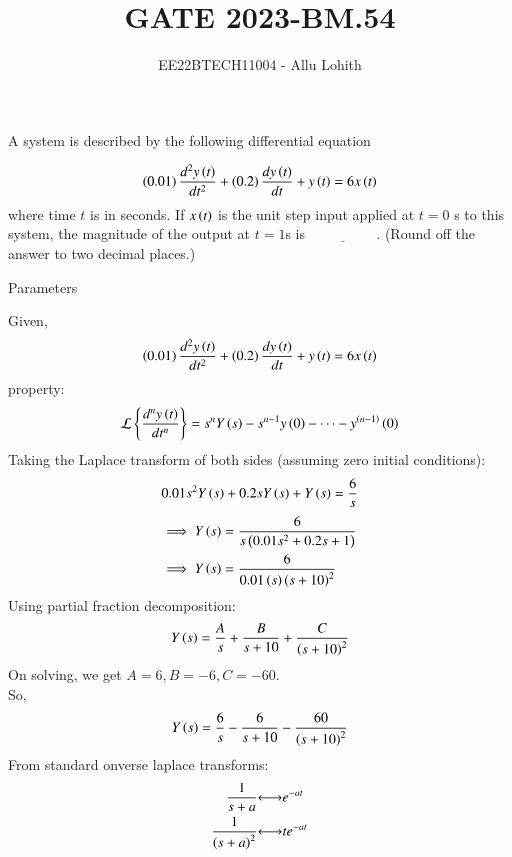 \documentclass[journal,12pt,twocolumn]{IEEEtran}
\theoremstyle{remark}
\begin{document}

\vspace{3cm}

\title{GATE 2023-BM.54}
\author{EE22BTECH11004 - Allu Lohith}

\maketitle

    A system is described by the following differential equation
    
    $$\left(0.01\right) \frac{d^2y\left(t\right)}{dt^2} + \left(0.2\right)\frac{dy\left(t\right) }{dt} + y\left(t\right) = 6x\left(t\right)$$
    where time $t$ is in seconds. If $x\left(t\right)$ is the unit step input applied at $t = 0$ s to this system, the magnitude of the output at $t = 1$s is $\underline{\hspace{2cm}}$. (Round off the answer to two decimal places.)\\
    
\solution
\begin{table}[h!]
\centering

\vspace{0.5cm}
\caption{\normalsize Parameters}
\end{table}
    Given,
    \begin{align}
         \left(0.01\right) \frac{d^2y\left(t\right)}{dt^2} + \left(0.2\right)\frac{dy\left(t\right) }{dt} + y\left(t\right) = 6x\left(t\right)
    \end{align}
    property:
    \begin{align}
        \mathcal{L}\left\{\frac{d^n y\left(t\right)}{dt^n}\right\} = s^n Y\left(s\right) - s^{n-1} y\left(0\right) - \dots - y^{\left(n-1\right)}\left(0\right)
    \end{align}
    Taking the Laplace transform of both sides (assuming zero initial conditions):
   \begin{align}
        0.01s^2Y\left(s\right) + 0.2sY\left(s\right) + Y\left(s\right) = \frac{6}{s}
    \end{align}
    \begin{align}
        \implies Y\left(s\right) &= \frac{6}{s\left(0.01s^2 + 0.2s + 1\right)}\\
        \implies Y\left(s\right) &= \frac{6}{ 0.01\left(s\right) \left(s + 10\right)^2}
    \end{align}
    Using partial fraction decomposition:
    \begin{align}
    Y\left(s\right) = \frac{A}{s} + \frac{B}{s + 10} + \frac{C}{\left(s + 10\right)^2}
    \end{align}
    On solving, we get $A=6,B=-6,C=-60$.\\
    So,\begin{align}
        Y\left(s\right) = \frac{6}{s} - \frac{6}{s + 10} - \frac{60}{\left(s + 10\right)^2}
    \end{align}
    From standard onverse laplace transforms:
    \begin{align}
	    \frac{1}{s+a}   &{\longleftrightarrow}    e^{-at}\\
	    \frac{1}{\left(s+a\right)^2}  &{\longleftrightarrow }  te^{-at}
    \end{align}	    
	    
\end{document}
